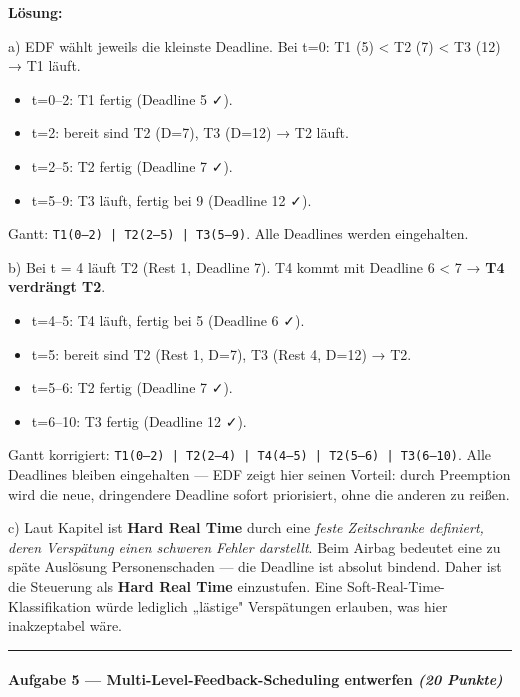 \documentclass[11pt, a4paper]{article}
\begin{document}
\textbf{Lösung:}


a) EDF wählt jeweils die kleinste Deadline. Bei t=0: T1 (5) < T2 (7) < T3 (12) → T1 läuft.

\begin{itemize}
  \item t=0–2: T1 fertig (Deadline 5 ✓).
  \item t=2: bereit sind T2 (D=7), T3 (D=12) → T2 läuft.
  \item t=2–5: T2 fertig (Deadline 7 ✓).
  \item t=5–9: T3 läuft, fertig bei 9 (Deadline 12 ✓).
\end{itemize}

Gantt: \texttt{T1(0–2) | T2(2–5) | T3(5–9)}. Alle Deadlines werden eingehalten.


b) Bei t = 4 läuft T2 (Rest 1, Deadline 7). T4 kommt mit Deadline 6 < 7 → \textbf{T4 verdrängt T2}.

\begin{itemize}
  \item t=4–5: T4 läuft, fertig bei 5 (Deadline 6 ✓).
  \item t=5: bereit sind T2 (Rest 1, D=7), T3 (Rest 4, D=12) → T2.
  \item t=5–6: T2 fertig (Deadline 7 ✓).
  \item t=6–10: T3 fertig (Deadline 12 ✓).
\end{itemize}

Gantt korrigiert: \texttt{T1(0–2) | T2(2–4) | T4(4–5) | T2(5–6) | T3(6–10)}. Alle Deadlines bleiben eingehalten — EDF zeigt hier seinen Vorteil: durch Preemption wird die neue, dringendere Deadline sofort priorisiert, ohne die anderen zu reißen.


c) Laut Kapitel ist \textbf{Hard Real Time} durch eine \textit{feste Zeitschranke definiert, deren Verspätung einen schweren Fehler darstellt}. Beim Airbag bedeutet eine zu späte Auslösung Personenschaden — die Deadline ist absolut bindend. Daher ist die Steuerung als \textbf{Hard Real Time} einzustufen. Eine Soft-Real-Time-Klassifikation würde lediglich „lästige" Verspätungen erlauben, was hier inakzeptabel wäre.



\noindent\textcolor{rulegray}{\rule{\linewidth}{0.4pt}}


\paragraph{Aufgabe 5 — Multi-Level-Feedback-Scheduling entwerfen \textit{(20 Punkte)}}\mbox{}\\[2pt]
\end{document}
